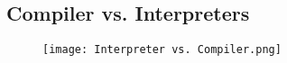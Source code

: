 \subsection{Compiler vs. Interpreters}
\begin{frame}

    \begin{figure}
        \texttt{[image: Interpreter vs. Compiler.png]}   
    \end{figure}


\end{frame}
